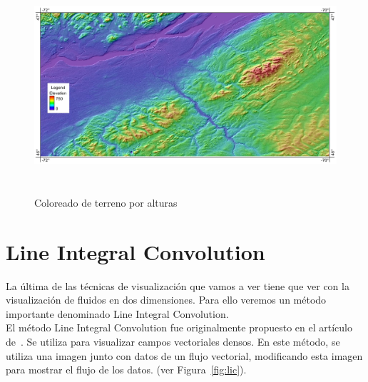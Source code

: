 \begin{figure}[h!]
	\centering	
	\includegraphics[height=8cm]{figures/terraincoloring.jpg}
	\caption{Coloreado de terreno por alturas}
	\label{fig:terrain}
\end{figure}

\section{Line Integral Convolution}
\label{ref:lic}

La última de las técnicas de visualización que vamos a ver tiene que ver con la
visualización de fluidos en dos dimensiones. Para ello veremos un método
importante denominado Line Integral Convolution.\\

El método Line Integral Convolution fue originalmente propuesto en el artículo
de~\citet{osti_10185520}. Se utiliza para visualizar campos vectoriales densos.
En este método, se utiliza una imagen junto con datos de un flujo vectorial,
modificando esta imagen para mostrar el flujo de los datos. (ver
Figura~\ref{fig:lic}). \\

